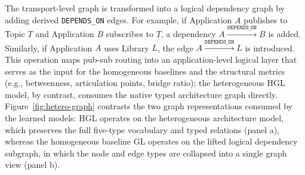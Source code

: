 \documentclass[sigconf,9pt,anonymous]{acmart}
\begin{document}
The transport-level graph is transformed into a logical dependency graph by adding derived \texttt{DEPENDS\_ON} edges. For example, if Application $A$ publishes to Topic $T$ and Application $B$ subscribes to $T$, a dependency $A \xrightarrow{\texttt{DEPENDS\_ON}} B$ is added. Similarly, if Application $A$ uses Library $L$, the edge $A \xrightarrow{\texttt{DEPENDS\_ON}} L$ is introduced. This operation maps pub-sub routing into an application-level logical layer that serves as the input for the homogeneous baselines and the structural metrics (e.g., betweenness, articulation points, bridge ratio); the heterogeneous HGL model, by contrast, consumes the native typed architecture graph directly. Figure~\ref{fig:hetero-graph} contrasts the two graph representations consumed by the learned models: HGL operates on the heterogeneous architecture model, which preserves the full five-type vocabulary and typed relations (panel a), whereas the homogeneous baseline GL operates on the lifted logical dependency subgraph, in which the node and edge types are collapsed into a single graph view (panel b).
\end{document}
